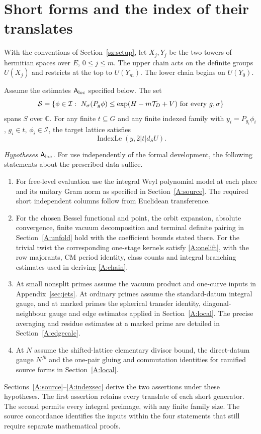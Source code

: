 \section{Short forms and the index of their translates}\label{A:section}
With the conventions of Section~\ref{sz:setup}, let $X_j,Y_j$ be the two towers of hermitian spaces over $E$, $0\le j\le m$. The upper chain acts on the definite groups $U(X_j)$ and restricts at the top to $U(Y_m)$. The lower chain begins on $U(Y_0)$.
\begin{chatAtheorem}\label{A:main}
Assume the estimates $\mathsf A_{\rm loc}$ specified below.
The set
\[
 \mathcal S=\{\phi\in\mathcal I:\ N_\sigma(P_g\phi)
       \le \exp(H-m\Tot_D+V)\text{ for every }g,\sigma\}
\]
spans $S$ over $\mathbb C$. For any finite $t\subseteq G$ and any finite indexed family with $y_i=P_{g_i}\phi_i$, $g_i\in t$, $\phi_i\in\mathcal I$, the target lattice satisfies
\begin{equation}\label{eq:short-index}
 \operatorname{IndexLe}(y,2|t|d_SU).
\end{equation}
\end{chatAtheorem}
\noindent\textit{Hypotheses $\mathsf A_{\rm loc}$.}\label{A:inputs}
For use independently of the formal development, the following statements about the prescribed data suffice.
\begin{enumerate}
\item For free-level evaluation use the integral Weyl polynomial model at each place and its unitary Gram norm as specified in Section~\ref{A:source}. The required short independent columns follow from Euclidean transference.
\item For the chosen Bessel functional and point, the orbit expansion, absolute convergence, finite vacuum decomposition and terminal definite pairing in Section~\ref{A:unfold} hold with the coefficient bounds stated there. For the trivial twist the corresponding one-stage kernels satisfy \eqref{A:onelift}, with the row majorants, CM period identity, class counts and integral branching estimates used in deriving \eqref{A:chain}.
\item At small nonsplit primes assume the vacuum product and one-curve inputs in Appendix~\ref{sec:jets}. At ordinary primes assume the standard-datum integral gauge, and at marked primes the spherical transfer identity, diagonal-neighbour gauge and edge estimates applied in Section~\ref{A:local}. The precise averaging and residue estimates at a marked prime are detailed in Section~\ref{A:edgecalc}.
\item At $N$ assume the shifted-lattice elementary divisor bound, the direct-datum gauge $N^{fb}$ and the one-pair gluing and commutation identities for ramified source forms in Section~\ref{A:local}.
\end{enumerate}
Sections~\ref{A:source}--\ref{A:indexsec} derive the two assertions under these hypotheses. The first assertion retains every translate of each short generator. The second permits every integral preimage, with any finite family size. The source concordance identifies the inputs within the four statements that still require separate mathematical proofs.

